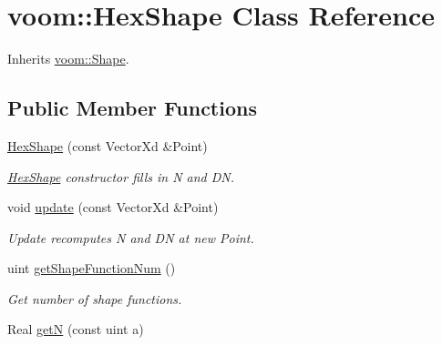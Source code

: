 \hypertarget{classvoom_1_1_hex_shape}{
\section{voom::HexShape Class Reference}
\label{classvoom_1_1_hex_shape}
}


Inherits \hyperlink{classvoom_1_1_shape}{voom::Shape}.\subsection*{Public Member Functions}
\begin{DoxyCompactItemize}
\item 
\hypertarget{classvoom_1_1_hex_shape_a31d0cd1118903018ba596cf65fce7c8b}{
\hyperlink{classvoom_1_1_hex_shape_a31d0cd1118903018ba596cf65fce7c8b}{HexShape} (const VectorXd \&Point)}
\label{classvoom_1_1_hex_shape_a31d0cd1118903018ba596cf65fce7c8b}

\begin{DoxyCompactList}\small\item\em \hyperlink{classvoom_1_1_hex_shape}{HexShape} constructor fills in N and DN. \item\end{DoxyCompactList}\item 
void \hyperlink{classvoom_1_1_hex_shape_a62e0194dcc933cede6fcde41e9cfcd1f}{update} (const VectorXd \&Point)
\begin{DoxyCompactList}\small\item\em Update recomputes N and DN at new Point. \item\end{DoxyCompactList}\item 
\hypertarget{classvoom_1_1_hex_shape_a33bdcbd4a583c7b3880dd4996536418b}{
uint \hyperlink{classvoom_1_1_hex_shape_a33bdcbd4a583c7b3880dd4996536418b}{getShapeFunctionNum} ()}
\label{classvoom_1_1_hex_shape_a33bdcbd4a583c7b3880dd4996536418b}

\begin{DoxyCompactList}\small\item\em Get number of shape functions. \item\end{DoxyCompactList}\item 
\hypertarget{classvoom_1_1_hex_shape_a892a849346184efe02d03943af8613f9}{
Real \hyperlink{classvoom_1_1_hex_shape_a892a849346184efe02d03943af8613f9}{getN} (const uint a)}
\label{classvoom_1_1_hex_shape_a892a849346184efe02d03943af8613f9}


\end{DoxyCompactItemize}
